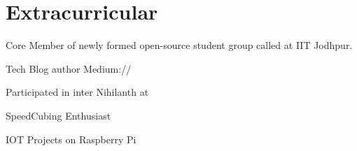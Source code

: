 \documentclass[]{deedy-resume-openfont}
\begin{document}
\begin{minipage}[t]{0.67\textwidth}

\section{Extracurricular} 
\begin{bulletedlist}
\item Core Member of newly formed open-source student group called  at IIT Jodhpur.
\item Tech Blog author Medium://  \href{https://medium.com/@anshul.ahu/}{} \\
\item Participated in inter  Nihilanth at 
\item SpeedCubing Enthusiast
\item IOT Projects on Raspberry Pi 

\end{bulletedlist}
\end{minipage} 
\end{document}
